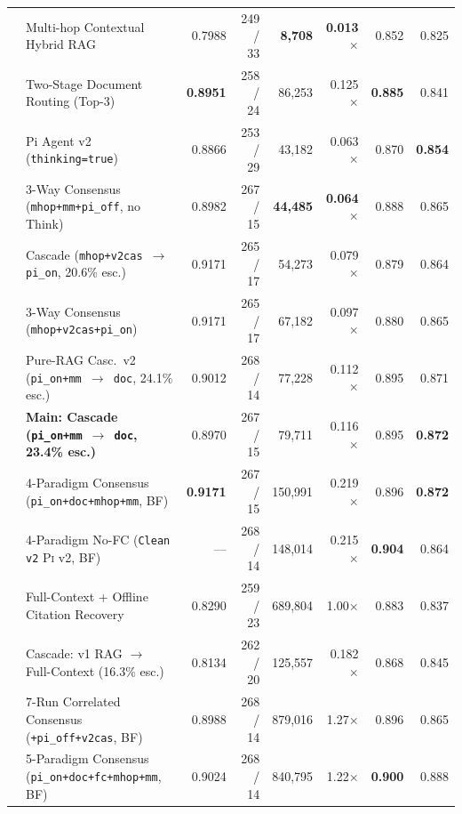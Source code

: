 \documentclass[sigconf,nonacm]{acmart}
\newcommand{\code}[1]{\texttt{\small #1}}
\begin{document}
\begin{table}[t]
\begin{tabular}{@{}llrrrrrr@{}}
      & Multi-hop Contextual Hybrid RAG & 0.7988 & 249 / 33 & \textbf{8,708} & \textbf{0.013$\times$} & 0.852 & 0.825 \\
      & Two-Stage Document Routing (Top-3) & \textbf{0.8951} & 258 / 24 & 86,253 & 0.125$\times$ & \textbf{0.885} & 0.841 \\
      & Pi Agent v2 (\code{thinking=true}) & 0.8866 & 253 / 29 & 43,182 & 0.063$\times$ & 0.870 & \textbf{0.854} \\
    \midrule
      & 3-Way Consensus (\code{mhop+mm+pi\_off}, no Think) & 0.8982 & 267 / 15 & \textbf{44,485} & \textbf{0.064$\times$} & 0.888 & 0.865 \\
      & Cascade (\code{mhop+v2cas $\to$ pi\_on}, 20.6\% esc.) & 0.9171 & 265 / 17 & 54,273 & 0.079$\times$ & 0.879 & 0.864 \\
      & 3-Way Consensus (\code{mhop+v2cas+pi\_on}) & 0.9171 & 265 / 17 & 67,182 & 0.097$\times$ & 0.880 & 0.865 \\
      & Pure-RAG Casc.\ v2 (\code{pi\_on+mm $\to$ doc}, 24.1\% esc.) & 0.9012 & 268 / 14 & 77,228 & 0.112$\times$ & 0.895 & 0.871 \\
      & \textbf{Main: Cascade (\code{pi\_on+mm $\to$ doc}, 23.4\% esc.)} & 0.8970 & 267 / 15 & 79,711 & 0.116$\times$ & 0.895 & \textbf{0.872} \\
      & 4-Paradigm Consensus (\code{pi\_on+doc+mhop+mm}, BF) & \textbf{0.9171} & 267 / 15 & 150,991 & 0.219$\times$ & 0.896 & \textbf{0.872} \\
      & 4-Paradigm No-FC (\code{Clean v2} \textsc{Pi} v2, BF) & --- & 268 / 14 & 148,014 & 0.215$\times$ & \textbf{0.904} & 0.864 \\
    \midrule
      & Full-Context + Offline Citation Recovery & 0.8290 & 259 / 23 & 689,804 & 1.00$\times$ & 0.883 & 0.837 \\
      & Cascade: v1 RAG $\to$ Full-Context (16.3\% esc.) & 0.8134 & 262 / 20 & 125,557 & 0.182$\times$ & 0.868 & 0.845 \\
      & 7-Run Correlated Consensus (\code{+pi\_off+v2cas}, BF) & 0.8988 & 268 / 14 & 879,016 & 1.27$\times$ & 0.896 & 0.865 \\
      & 5-Paradigm Consensus (\code{pi\_on+doc+fc+mhop+mm}, BF) & 0.9024 & 268 / 14 & 840,795 & 1.22$\times$ & \textbf{0.900} & 0.888 \\

\end{tabular}
\end{table}
\end{document}
